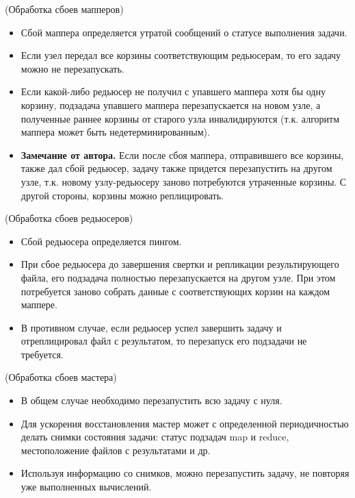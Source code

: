 \begin{algorithm}(Обработка сбоев мапперов)
    \begin{itemize}
        \item Сбой маппера определяется утратой сообщений о статусе выполнения задачи.
        \item Если узел передал все корзины соответствующим редьюсерам, то его задачу
            можно не перезапускать.
        \item Если какой-либо редьюсер не получил с упавшего маппера хотя бы одну
            корзину, подзадача упавшего маппера перезапускается на новом узле, а полученные раннее корзины
            от старого узла инвалидируются (т.к. алгоритм маппера может быть недетерминированным).
        \item \textbf{Замечание от автора.} Если после сбоя маппера, отправившего все
            корзины, также дал сбой редьюсер, задачу также придется перезапустить на
            другом узле, т.к. новому узлу-редьюсеру заново потребуются утраченные
            корзины. С другой стороны, корзины можно реплицировать.
    \end{itemize}
\end{algorithm}

\begin{algorithm}(Обработка сбоев редьюсеров)
    \begin{itemize}
        \item Сбой редьюсера определяется пингом.
        \item При сбое редьюсера до завершения свертки и репликации результирующего
            файла, его подзадача полностью перезапускается на другом узле. При этом потребуется
            заново собрать данные с соответствующих корзин на каждом маппере.
        \item В противном случае, если редьюсер успел завершить задачу и отреплицировал файл с результатом,
            то перезапуск его подзадачи не требуется.
    \end{itemize}
\end{algorithm}

\begin{algorithm}(Обработка сбоев мастера)
\begin{itemize}
    \item В общем случае необходимо перезапустить всю задачу с нуля.
    \item Для ускорения восстановления мастер может с определенной периодичностью делать снимки состояния
        задачи: статус подзадач map и reduce, местоположение файлов с результатами и др.
    \item Используя информацию со снимков, можно перезапустить задачу,
        не повторяя уже выполненных вычислений.
    \end{itemize}
\end{algorithm}

